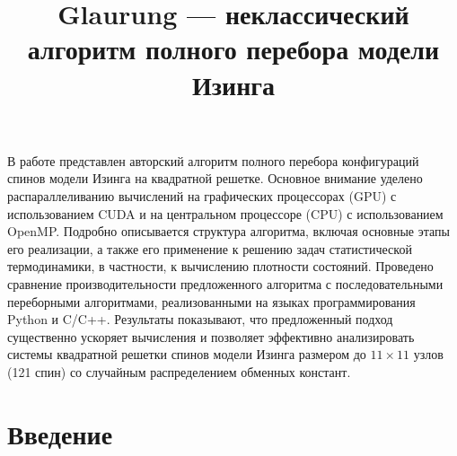\documentclass[10pt]{article}
\begin{document}
	\title{Glaurung --- неклассический алгоритм полного перебора модели Изинга}
	
	\makeface
	
	
	
	
	
	\abstract
	В работе представлен авторский алгоритм полного перебора конфигураций спинов модели Изинга на квадратной решетке. Основное внимание уделено распараллеливанию вычислений на графических процессорах (GPU) с использованием CUDA и на центральном процессоре (CPU) с использованием OpenMP. Подробно описывается структура алгоритма, включая основные этапы его реализации, а также его применение к решению задач статистической термодинамики, в частности, к вычислению плотности состояний. Проведено сравнение производительности предложенного алгоритма с последовательными переборными алгоритмами, реализованными на языках программирования Python и C/C++. Результаты показывают, что предложенный подход существенно ускоряет вычисления и позволяет эффективно анализировать системы квадратной решетки спинов модели Изинга размером до $11 \times 11$ узлов (121 спин) со случайным распределением обменных констант.
	
	
	
	\section*{Введение}
	
\end{document}
